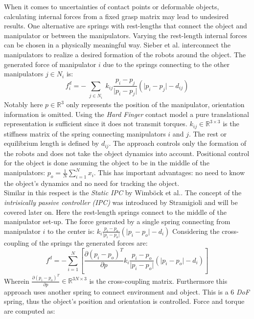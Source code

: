 \documentclass[a4paper,twoside, openright,12pt]{report}
\begin{document}
When it comes to uncertainties of contact points or deformable objects, calculating internal forces from a fixed grasp matrix may lead to undesired results. One alternative are springs with rest-lengths that connect the object and manipulator or between the manipulators. Varying the rest-length internal forces can be chosen in a physically meaningful way.
Sieber et al.\cite{Sieber_15} interconnect the manipulators to realize a desired formation of the robots around the object. The generated force of manipulator $ i $ due to the springs connecting to the other manipulators $ j \in N_i $ is:
\begin{equation}
f_i^d = - \sum_{\substack{j\in N_i}} k_{ij} \dfrac{p_i - p_j}{\vert p_i - p_j \vert} (\vert p_i-p_j\vert - d_{ij})
\end{equation}
Notably here $ p\in\mathbb{R}^3 $ only represents the position of the manipulator, orientation information is omitted. Using the \emph{Hard Finger} contact model a pure translational representation is sufficient since it does not transmit torques. $ k_{ij} \in \mathbb{R}^{3 \times 3} $ is the stiffness matrix of the spring connecting manipulators $ i $ and $ j $. The rest or equilibrium length is defined by $ d_{ij} $.
The approach controls only the formation of the robots and does not take the object dynamics into account. Positional control for the object is done assuming the object to be in the middle of the manipulators: $ p_o = \frac{1}{N} \sum\nolimits_{i=1}^{N} x_i $. This has important advantages: no need to know the object's dynamics and no need for tracking the object.\\
Similar in this respect is the  \emph{Static IPC} by Wimb\"ock et al.\cite{Wimboeck_06}. The concept of the \emph{intrisically passive controller (IPC)} was introduced by Stramigioli\cite{Stramigioli_01} and will be covered later on. Here the rest-length springs connect to the middle of the manipulator set-up. The force generated by a single spring connecting from manipulator $ i $ to the center is: $ k_{i} \frac{p_i - p_o}{\vert p_i - p_o \vert} (\vert p_i-p_o\vert - d_{i}) $ Considering the cross-coupling of the springs the generated forces are:
\begin{equation}
f^d  = - \sum_{i=1}^N\left[\dfrac{\partial (p_i-p_o)^T}{\partial p} k_i \dfrac{p_i-p_o}{\vert p_i-p_o\vert}  (\vert p_i-p_o\vert - d_i) \right]
\end{equation}
Wherein $ \frac{\partial (p_i-p_o)^T}{\partial p} \in \mathbb{R}^{3N \times 3} $ is the cross-coupling matrix.
Furthermore this approach uses another spring to connect environment and object. This is a 6 \emph{DoF} spring, thus the object's position and orientation is controlled. Force and torque are computed as:
\end{document}
